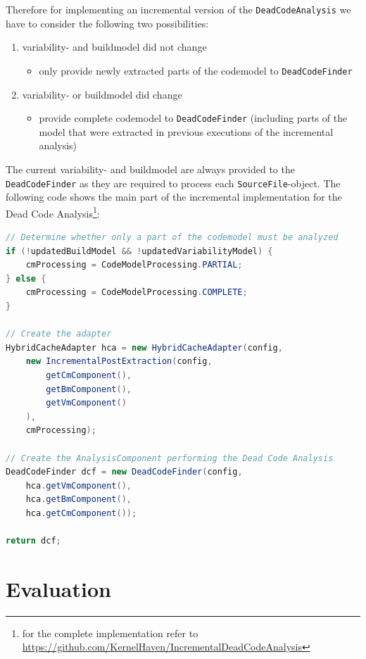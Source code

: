 \documentclass[a4paper]{article}
\begin{document}
Therefore for implementing an incremental version of the \texttt{DeadCodeAnalysis} we have to consider the following two possibilities:

\begin{enumerate}
 \item variability- and buildmodel did not change
 \begin{itemize}
 	\item only provide newly extracted parts of the codemodel to \texttt{DeadCodeFinder}
 \end{itemize}
  \item variability- or buildmodel did change
 \begin{itemize}
 	\item provide complete codemodel to \texttt{DeadCodeFinder} (including parts of the model that were extracted in previous executions of the incremental analysis)
 \end{itemize}
\end{enumerate}

The current variability- and buildmodel are always provided to the \texttt{DeadCodeFinder} as they are required to process each \texttt{SourceFile}-object. The following code shows the main part of the incremental implementation for the Dead Code Analysis\footnote{for the complete implementation refer to \url{https://github.com/KernelHaven/IncrementalDeadCodeAnalysis}}:

\begin{lstlisting}[language=java]
// Determine whether only a part of the codemodel must be analyzed
if (!updatedBuildModel && !updatedVariabilityModel) {
    cmProcessing = CodeModelProcessing.PARTIAL;
} else {
    cmProcessing = CodeModelProcessing.COMPLETE;
}

// Create the adapter
HybridCacheAdapter hca = new HybridCacheAdapter(config,
    new IncrementalPostExtraction(config, 
        getCmComponent(), 
        getBmComponent(), 
        getVmComponent()
    ),
    cmProcessing);

// Create the AnalysisComponent performing the Dead Code Analysis
DeadCodeFinder dcf = new DeadCodeFinder(config, 
    hca.getVmComponent(), 
    hca.getBmComponent(),
    hca.getCmComponent());

return dcf;
\end{lstlisting}

\newpage
\section{Evaluation}\label{evaluation}
\end{document}
